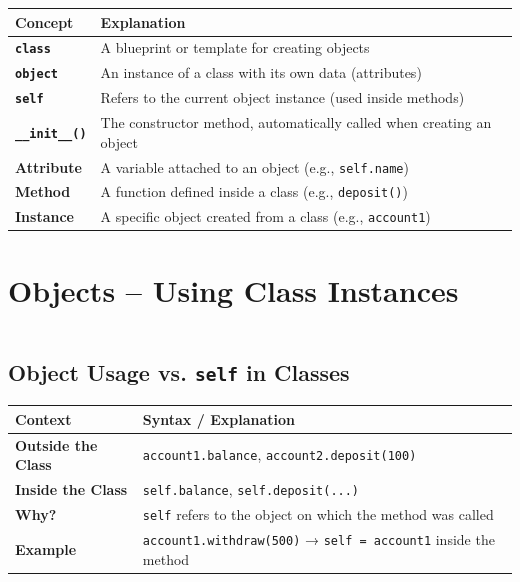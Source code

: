 \documentclass[a4paper,11pt]{article}
\begin{document}
\renewcommand{\arraystretch}{1.6}
\begin{tabular}{>{\bfseries}p{3.8cm} p{9.2cm}}
	\toprule
	Concept & Explanation \\
	\midrule
	
	\texttt{class} & A blueprint or template for creating objects \\
	\texttt{object} & An instance of a class with its own data (attributes) \\
	\texttt{self} & Refers to the current object instance (used inside methods) \\
	\texttt{\_\_init\_\_()} & The constructor method, automatically called when creating an object \\
	Attribute & A variable attached to an object (e.g., \texttt{self.name}) \\
	Method & A function defined inside a class (e.g., \texttt{deposit()}) \\
	Instance & A specific object created from a class (e.g., \texttt{account1}) \\
	
	\bottomrule
\end{tabular}

		\newpage
		
\section{Objects – Using Class Instances}
\inputminted{python}{Python_Files/object_usage_guid.py}

\vspace{1em}
\subsection*{Object Usage vs. \texttt{self} in Classes}

\renewcommand{\arraystretch}{1.6}
\begin{tabular}{>{\bfseries}p{5cm} p{8cm}}
	\toprule
	Context & Syntax / Explanation \\
	\midrule
	
	Outside the Class & \texttt{account1.balance}, \texttt{account2.deposit(100)} \\
	Inside the Class & \texttt{self.balance}, \texttt{self.deposit(...)} \\
	Why? & \texttt{self} refers to the object on which the method was called \\
	Example & \texttt{account1.withdraw(500)} → \texttt{self = account1} inside the method \\
	
	\bottomrule
\end{tabular}
\end{document}
